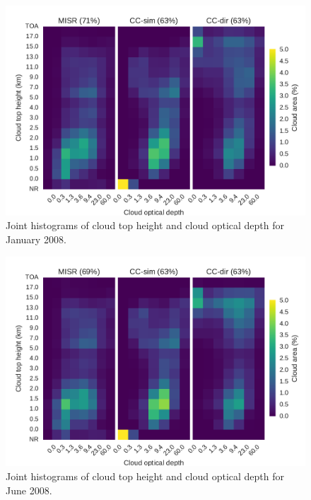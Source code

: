 \begin{figure}[htbp]
\centering
\includegraphics{graphics/misr_clmisr_Pacific_2008-01.pdf}
\caption{\label{fig:misr_cthtau_Pacific_january}Joint histograms of
cloud top height and cloud optical depth for January
2008.}\label{fig:misrux5fcthtauux5fPacificux5fjanuary}
\end{figure}

\begin{figure}[htbp]
\centering
\includegraphics{graphics/misr_clmisr_Pacific_2008-06.pdf}
\caption{\label{fig:misr_cthtau_Pacific_june}Joint histograms of cloud
top height and cloud optical depth for June
2008.}\label{fig:misrux5fcthtauux5fPacificux5fjune}
\end{figure}


